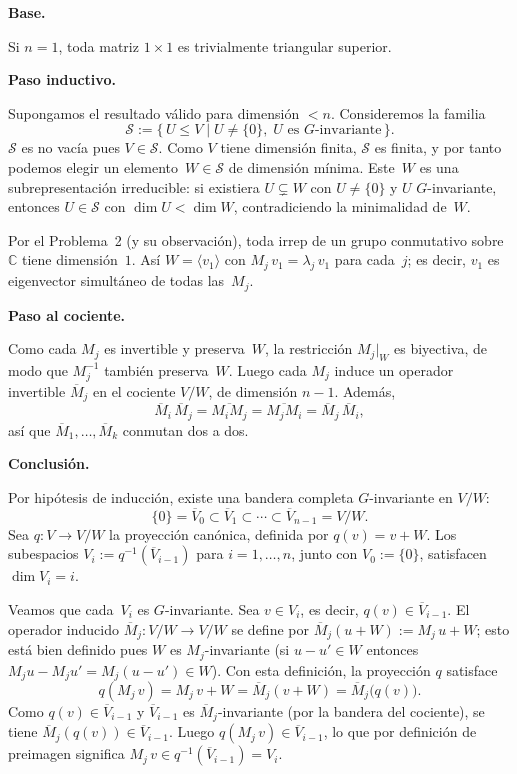 \documentclass[10pt,a4paper]{article}
\newcommand{\CC}{\mathbb{C}}
\newcommand{\inlinehead}[2][repblue]{%
  \par\smallskip
  {\color{#1}\bfseries #2.}\hspace{0.45em}%
}
\begin{document}
\inlinehead[repteal]{Base}
Si $n=1$, toda matriz $1\times 1$ es trivialmente triangular superior.

\inlinehead[repteal]{Paso inductivo}
Supongamos el resultado válido para dimensión $<n$. Consideremos la familia
\[
  \mathcal{S}:=\{\,U\leq V \mid U\neq\{0\},\;\text{$U$ es $G$-invariante}\,\}.
\]
$\mathcal{S}$ es no vacía pues $V\in\mathcal{S}$. Como $V$ tiene dimensión
finita, $\mathcal{S}$ es finita, y por tanto podemos elegir un
elemento~$W\in\mathcal{S}$ de dimensión mínima. Este~$W$ es una
subrepresentación irreducible: si existiera $U\subsetneq W$ con
$U\neq\{0\}$ y $U$ $G$-invariante, entonces $U\in\mathcal{S}$ con
$\dim U<\dim W$, contradiciendo la minimalidad de~$W$.

Por el Problema~2 (y su observación), toda irrep de un grupo conmutativo
sobre~$\CC$ tiene dimensión~$1$. Así $W=\langle v_1\rangle$ con
$M_j\,v_1=\lambda_j\,v_1$ para cada~$j$; es decir, $v_1$ es eigenvector
simultáneo de todas las~$M_j$.

\inlinehead[repteal]{Paso al cociente}
Como cada $M_j$ es invertible y preserva~$W$, la restricción $M_j|_W$ es
biyectiva, de modo que $M_j^{-1}$ también preserva~$W$. Luego cada $M_j$
induce un operador invertible $\overline{M}_j$ en el cociente $V/W$, de
dimensión $n-1$. Además,
\[
  \overline{M}_i\,\overline{M}_j
    = \overline{M_iM_j}
    = \overline{M_jM_i}
    = \overline{M}_j\,\overline{M}_i,
\]
así que $\overline{M}_1,\dots,\overline{M}_k$ conmutan dos a dos.

\inlinehead[repteal]{Conclusión}
Por hipótesis de inducción, existe una bandera completa
$G$-invariante en $V/W$:
\[
  \{0\}=\overline{V}_0
    \subset \overline{V}_1
    \subset \cdots
    \subset \overline{V}_{n-1}=V/W.
\]
Sea $q\colon V\to V/W$ la proyección canónica, definida por
$q(v)=v+W$. Los subespacios $V_i:=q^{-1}(\overline{V}_{i-1})$ para
$i=1,\dots,n$, junto con $V_0:=\{0\}$, satisfacen $\dim V_i=i$.

Veamos que cada~$V_i$ es $G$-invariante. Sea $v\in V_i$, es decir,
$q(v)\in\overline{V}_{i-1}$. El operador inducido
$\overline{M}_j\colon V/W\to V/W$ se define por
$\overline{M}_j(u+W):=M_j\,u+W$; esto está bien definido pues $W$ es
$M_j$-invariante (si $u-u'\in W$ entonces $M_j u-M_j u'=M_j(u-u')\in W$).
Con esta definición, la proyección $q$ satisface
\[
  q(M_j\,v) = M_j\,v + W = \overline{M}_j(v+W) = \overline{M}_j\bigl(q(v)\bigr).
\]
Como $q(v)\in\overline{V}_{i-1}$ y $\overline{V}_{i-1}$ es
$\overline{M}_j$-invariante (por la bandera del cociente), se tiene
$\overline{M}_j(q(v))\in\overline{V}_{i-1}$. Luego
$q(M_j\,v)\in\overline{V}_{i-1}$, lo que por definición de preimagen
significa $M_j\,v\in q^{-1}(\overline{V}_{i-1})=V_i$.
\end{document}
